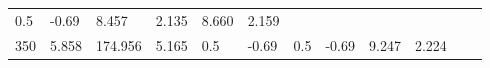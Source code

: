 \documentclass{article}
\begin{document}
\begin{longtable}[]{@{}llllllllllll@{}}
\begin{minipage}[t]{0.03\columnwidth}
0.5\strut
\end{minipage} & \begin{minipage}[t]{0.06\columnwidth}\raggedright\strut
-0.69\strut
\end{minipage} & \begin{minipage}[t]{0.06\columnwidth}\raggedright\strut
8.457\strut
\end{minipage} & \begin{minipage}[t]{0.08\columnwidth}\raggedright\strut
2.135\strut
\end{minipage} & \begin{minipage}[t]{0.06\columnwidth}\raggedright\strut
8.660\strut
\end{minipage} & \begin{minipage}[t]{0.09\columnwidth}\raggedright\strut
2.159\strut
\end{minipage}\tabularnewline
\begin{minipage}[t]{0.03\columnwidth}\raggedright\strut
350\strut
\end{minipage} & \begin{minipage}[t]{0.06\columnwidth}\raggedright\strut
5.858\strut
\end{minipage} & \begin{minipage}[t]{0.06\columnwidth}\raggedright\strut
174.956\strut
\end{minipage} & \begin{minipage}[t]{0.08\columnwidth}\raggedright\strut
5.165\strut
\end{minipage} & \begin{minipage}[t]{0.03\columnwidth}\raggedright\strut
0.5\strut
\end{minipage} & \begin{minipage}[t]{0.06\columnwidth}\raggedright\strut
-0.69\strut
\end{minipage} & \begin{minipage}[t]{0.03\columnwidth}\raggedright\strut
0.5\strut
\end{minipage} & \begin{minipage}[t]{0.06\columnwidth}\raggedright\strut
-0.69\strut
\end{minipage} & \begin{minipage}[t]{0.06\columnwidth}\raggedright\strut
9.247\strut
\end{minipage} & \begin{minipage}[t]{0.08\columnwidth}\raggedright\strut
2.224\strut
\end{minipage} & \begin{minipage}[t]{0.06\columnwidth}\raggedright\strut

\end{minipage}
\end{longtable}
\end{document}
